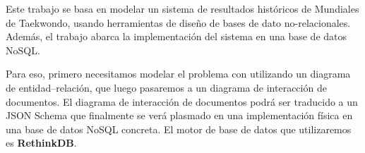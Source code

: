 Este trabajo se basa en modelar un sistema de resultados históricos de Mundiales de Taekwondo, usando herramientas de diseño de bases de dato no-relacionales. Además, el trabajo abarca la implementación del sistema en una base de datos NoSQL.

Para eso, primero necesitamos modelar el problema con utilizando un diagrama de entidad--relación, que luego pasaremos a un diagrama de interacción de documentos. El diagrama de interacción de documentos podrá ser traducido a un JSON Schema que finalmente se verá plasmado en una implementación física en una base de datos NoSQL concreta.
El motor de base de datos que utilizaremos es \textbf{RethinkDB}.


